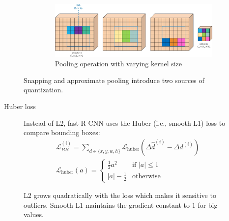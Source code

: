 \begin{description}
\begin{description}
\begin{enumerate}
\begin{figure}[H]
                            \includegraphics[width=0.8\linewidth]{./img/_roipool_maxpool.jpg}
                            \caption{Pooling operation with varying kernel size}
                        \end{figure}
                \end{enumerate}

                \begin{remark}
                    Snapping and approximate pooling introduce two sources of quantization.
                \end{remark}

            \item[Huber loss] 
                Instead of L2, fast R-CNN uses the Huber (i.e., smooth L1) loss to compare bounding boxes:
                \[ 
                    \begin{gathered}
                        \mathcal{L}_{BB}^{(i)} = \sum_{d \in \{ x, y, w, h \}} \mathcal{L}_\text{huber}\left( \Delta\hat{d}^{(i)} - \Delta d^{(i)} \right) \\
                        \mathcal{L}_\text{huber}(a) = \begin{cases}
                            \frac{1}{2}a^2 & \text{if $|a| \leq 1$} \\
                            |a| - \frac{1}{2} & \text{otherwise}
                        \end{cases}
                    \end{gathered}
                \]

                \begin{remark}
                    L2 grows quadratically with the loss which makes it sensitive to outliers. Smooth L1 maintains the gradient constant to $1$ for big values.
                \end{remark}
        \end{description}


\end{description}
